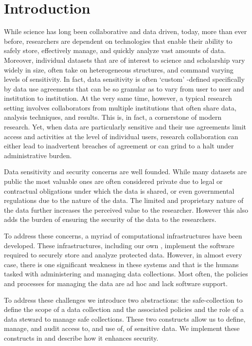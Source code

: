 \section{Introduction}



While science has long been collaborative and data driven, today, more than ever before,
researchers are dependent on technologies that enable their ability to safely store,
effectively manage, and quickly analyze vast amounts of
data. Moreover, individual datasets that are of interest to science and scholarship
vary widely in size, often take on heterogeneous structures, and command varying
levels of sensitivity. In fact, data sensitivity is often `custom' -defined specifically by
data use agreements that can be so granular as to vary from user to user and institution
to institution. At the very same time, however, a typical research setting involves
collaborators from multiple institutions that often share data, analysis techniques,
and results. This is, in fact, a cornerstone of modern research. Yet, when data are
particularly sensitive and their use agreements limit access and activities at the
level of individual users, research collaboration can either lead to inadvertent
breaches of agreement or can grind to a halt under administrative burden.



Data sensitivity and security concerns are well founded. While many datasets are public the most
valuable ones are often considered private due to legal or contractual obligations under which the data
is shared, or even governmental regulations due to the nature of the data. The limited and proprietary nature
of the data further increases the perceived value to the researcher. However this also adds the burden of
ensuring the security of the data to the researchers.

To address these concerns, a myriad of computational infrastructures
have been developed. These infrastructures, including our own \NAMENS \cite{babuji2016cloud},
implement the software required to securely store and analyze protected
data. However, in almost every case, there is one significant weakness in these systems
and that is the humans tasked with administering and managing
data collections. Most often, the policies and processes for managing
the data are ad hoc and lack software support.

To address these challenges we introduce two abstractions:
the safe-collection to define the scope of a data collection
and the associated policies and the role of a data steward
to manage safe collections.  These two constructs allow us
to define, manage, and audit access to, and use of, of
sensitive data.  We implement these constructs in \NAME and
describe how it enhances security.


